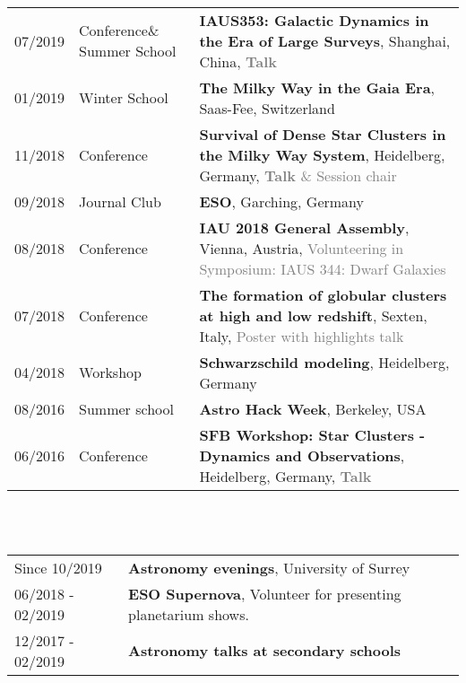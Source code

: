 \documentclass[a4paper,10pt,oneside]{article}
\begin{document}
\\
\\
 \smallskip \\
\noindent\begin{tabular}{@{}p{2cm}@{}@{}p{2.9cm}@{}@{}p{10.9cm}@{}}
07/2019& Conference\& Summer School&\textbf{IAUS353: Galactic Dynamics in the Era of Large Surveys}, Shanghai, China, \textcolor{gray}{\textbf{Talk}}\\
01/2019&Winter School&\textbf{The Milky Way in the Gaia Era}, Saas-Fee, Switzerland\\
11/2018& Conference &\textbf{Survival of Dense Star Clusters in the Milky Way System}, Heidelberg, Germany, \textcolor{gray}{\textbf{Talk} \& Session chair} \\
09/2018 & Journal Club& \textbf{ESO}, Garching, Germany\\
08/2018& Conference & \textbf{IAU 2018 General Assembly}, Vienna, Austria, \textcolor{gray}{Volunteering in Symposium: IAUS 344: Dwarf Galaxies}\\
07/2018& Conference &\textbf{The formation of globular clusters at high and low redshift}, Sexten, Italy, \textcolor{gray}{Poster with highlights talk}\\
04/2018& Workshop &\textbf{Schwarzschild modeling}, Heidelberg, Germany \\
08/2016&Summer school&\textbf{Astro Hack Week}, Berkeley, USA \\
06/2016& Conference&\textbf{SFB Workshop: Star Clusters - Dynamics and Observations}, Heidelberg, Germany, \textcolor{gray}{\textbf{Talk}}\\
\end{tabular}\\
 \smallskip \\
\noindent \begin{tabular}{@{}p{3.3cm}@{}@{}p{12.5cm}@{}}
Since 10/2019& \textbf{Astronomy evenings}, University of Surrey \\
06/2018 - 02/2019&\textbf{ESO Supernova},  Volunteer for presenting planetarium shows.\\
12/2017 - 02/2019&  \textbf{Astronomy talks at secondary schools}\\
\end{tabular}\\
\end{document}

